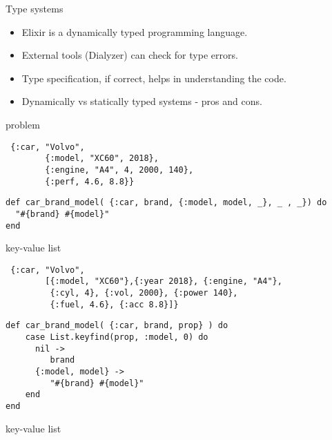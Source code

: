 \begin{frame}{Type systems}

\begin{itemize}
\item Elixir is a dynamically typed programming language. \pause
\item External tools (Dialyzer) can check for type errors.  \pause
\item Type specification, if correct, helps in understanding the code.  \pause
\item Dynamically vs statically typed systems - pros and cons.  \pause
\end{itemize}

\end{frame}

\begin{frame}[fragile]{problem}

\begin{verbatim}
 {:car, "Volvo", 
        {:model, "XC60", 2018}, 
        {:engine, "A4", 4, 2000, 140}, 
        {:perf, 4.6, 8.8}}
\end{verbatim}

\vspace{20pt} \pause
  
\begin{verbatim}
def car_brand_model( {:car, brand, {:model, model, _}, _ , _}) do 
  "#{brand} #{model}"
end
\end{verbatim}
\end{frame}


\begin{frame}[fragile]{key-value list}

\begin{verbatim}
 {:car, "Volvo", 
        [{:model, "XC60"},{:year 2018}, {:engine, "A4"}, 
         {:cyl, 4}, {:vol, 2000}, {:power 140}, 
         {:fuel, 4.6}, {:acc 8.8}]}
\end{verbatim}
  
\vspace{20pt} \pause

\begin{verbatim}
def car_brand_model( {:car, brand, prop} ) do
    case List.keyfind(prop, :model, 0) do
      nil -> 
         brand
      {:model, model} ->
         "#{brand} #{model}"
    end
end
\end{verbatim}
\end{frame}

\begin{frame}[fragile]{key-value list}

\vspace{20pt}


\vspace{40pt}
  
\end{frame}


